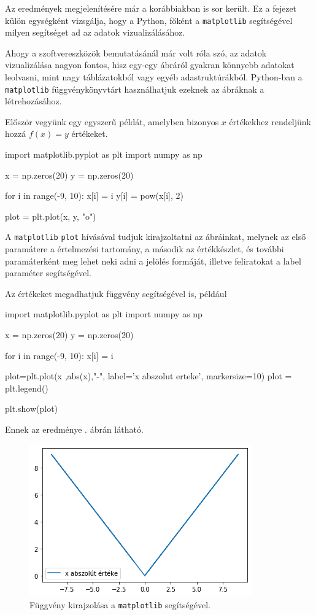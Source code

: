 
Az eredmények megjelenítésére már a korábbiakban is sor került. Ez a fejezet külön egységként vizsgálja, hogy a Python, főként a \texttt{matplotlib} segítségével milyen segítséget ad az adatok vizualizálásához.

    
Ahogy a szoftvereszközök bemutatásánál már volt róla szó, az adatok
vizualizálása nagyon fontos, hisz egy-egy ábráról gyakran könnyebb adatokat
leolvasni, mint nagy táblázatokból vagy egyéb adastruktúrákból.
Python-ban a \texttt{matplotlib} függvénykönyvtárt használhatjuk ezeknek az ábráknak a
létrehozásához.

    Először vegyünk egy egyszerű példát, amelyben bizonyos \(x\) értékekhez
rendeljünk hozzá \(f(x) = y\) értékeket.
\begin{python}
import matplotlib.pyplot as plt
import numpy as np

x = np.zeros(20)
y = np.zeros(20)

for i in range(-9, 10):
    x[i] = i
    y[i] = pow(x[i], 2)
    
plot = plt.plot(x, y, "o")
\end{python}
    A \texttt{matplotlib} \texttt{plot} hívásával tudjuk kirajzoltatni az
ábráinkat, melynek az első paramátere a értelmezési tartomány, a második
az értékkészlet, és további paramáterként meg lehet neki adni a jelölés
formáját, illetve feliratokat a label paraméter segítségével.

Az értékeket megadhatjuk függvény segítségével is, például
\begin{python}
import matplotlib.pyplot as plt
import numpy as np

x = np.zeros(20)
y = np.zeros(20)

for i in range(-9, 10):
    x[i] = i
    
plot=plt.plot(x ,abs(x),"-", label='x abszolut erteke', markersize=10)
plot = plt.legend()

plt.show(plot)
\end{python}
Ennek az eredménye . ábrán látható.

\begin{figure}[h!]
\centering
\includegraphics[scale=1.0]{img/abs-plot.png}
\caption{Függvény kirajzolása a \texttt{matplotlib} segítségével.}
\label{fig:abs-plot}
\end{figure}

